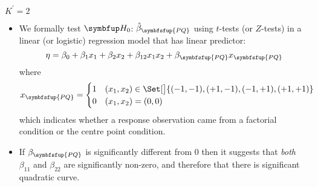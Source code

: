 \begin{Example}{$ K^\prime=2 $}{}
\begin{itemize}
        \item We formally test $ \HN $: $ \hat{\beta}_{\symbfsfup{PQ}} $ using $t$-tests (or $Z$-tests) in a linear (or logistic) regression model
              that has linear predictor:
              \[ \eta=\beta_0+\beta_1x_1+\beta_2x_2+\beta_{12}x_1x_2+\beta_{\symbfsfup{PQ}}x_{\symbfsfup{PQ}} \]
              where
              \[ x_{\symbfsfup{PQ}}=\begin{cases}
                      1 & (x_1,x_2)\in\Set[\big]{(-1,-1),(+1,-1),(-1,+1),(+1,+1)} \\
                      0 & (x_1,x_2)=(0,0)
                  \end{cases} \]
              which indicates whether a response observation came from a factorial condition or the centre point condition.
        \item If $ \beta_{\symbfsfup{PQ}} $ is significantly different from 0 then it suggests that \emph{both} $ \beta_{11} $ and $ \beta_{22} $
              are significantly non-zero, and therefore that there is significant quadratic curve.
    \end{itemize}
\end{Example}
